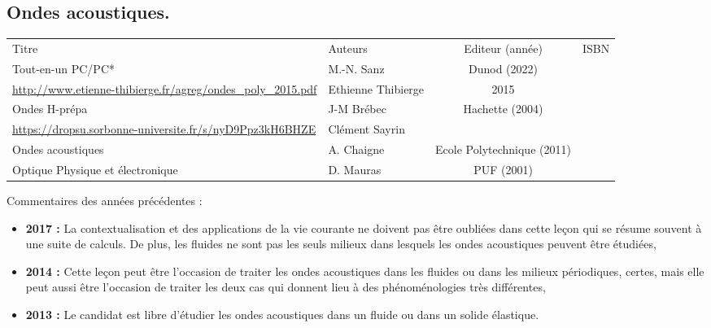 \begin{headerBlock}
  \chapter{Ondes acoustiques.}
  \label{LP_OndeAcoustique} 
\end{headerBlock}




\begin{center}
\begin{tabularx}{\textwidth}{| X | X | c | c |}
  \hline
  \rowcolor{gray!20}\multicolumn{4}{c}{Bibliographie de la leçon : } \\
  \hline 
  Titre & Auteurs & Editeur (année) & ISBN \\
  \hline
  Tout-en-un PC/PC* & M.-N. Sanz & Dunod (2022) & \\
  \hline 
   \url{http://www.etienne-thibierge.fr/agreg/ondes_poly_2015.pdf} & Ethienne Thibierge & 2015 &  \\
  \hline 
  Ondes H-prépa & J-M Brébec & Hachette (2004) & \\
  \hline
  \url{https://dropsu.sorbonne-universite.fr/s/nyD9Ppz3kH6BHZE} & Clément Sayrin & & \\
  \hline
  Ondes acoustiques & A. Chaigne & Ecole Polytechnique (2011) & \\
  \hline
  Optique Physique et électronique & D. Mauras & PUF (2001) & \\
  \hline
\end{tabularx}
\end{center}

\begin{reportBlock}{Commentaires des années précédentes :}
    \begin{itemize}
        \item \textbf{2017 :} La contextualisation et des applications de la vie courante ne doivent pas être oubliées dans cette leçon qui se résume souvent à une suite de calculs. De plus, les fluides ne sont pas les seuls milieux dans lesquels les ondes acoustiques peuvent être étudiées,
        \item \textbf{2014 :} Cette leçon peut être l’occasion de traiter les ondes acoustiques dans les fluides ou dans les milieux périodiques, certes, mais elle peut aussi être l’occasion de traiter les deux cas qui donnent lieu à des phénoménologies très différentes,
        \item \textbf{2013 :} Le candidat est libre d’étudier les ondes acoustiques dans un fluide ou dans un solide élastique.
    \end{itemize}
\end{reportBlock}

